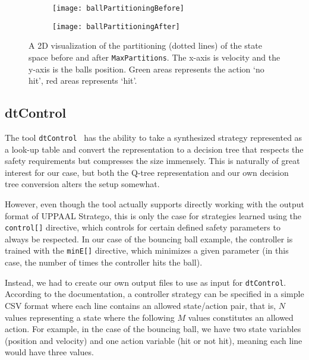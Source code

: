 \begin{figure}[ht]
    \begin{subfigure}[b]{.4\textwidth}
        \centering
        \texttt{[image: ballPartitioningBefore]}
        \label{fig:ballPartitioningBefore}
    \end{subfigure}
    \begin{subfigure}[b]{.4\textwidth}
        \centering
        \texttt{[image: ballPartitioningAfter]}
        \label{fig:ballPartitioningAfter}
    \end{subfigure}
    \caption{%
        A 2D visualization of the partitioning (dotted lines) of the state space
        before and after \texttt{MaxPartitions}. The x-axis is velocity and the
        y-axis is the balls position. Green areas represents the action `no
        hit', red areas represents `hit'.
    }\label{fig:ballPartitioning}
\end{figure}

\subsection{dtControl}%
\label{subsec:dtControl}

The tool \texttt{dtControl}~\cite{dtControl2} has the ability to take a
synthesized strategy represented as a look-up table and convert the
representation to a decision tree that respects the safety requirements but
compresses the size immensely.  This is naturally of great interest for our
case, but both the Q-tree representation and our own decision tree conversion
alters the setup somewhat.

However, even though the tool actually supports directly working with the output
format of UPPAAL Stratego, this is only the case for strategies learned using
the \texttt{control[]} directive, which controls for certain defined safety
parameters to always be respected. In our case of the bouncing ball example, the
controller is trained with the \texttt{minE[]} directive, which minimizes a
given parameter (in this case, the number of times the controller hits the
ball).

Instead, we had to create our own output files to use as input for
\texttt{dtControl}. According to the documentation, a controller strategy can be
specified in a simple CSV format where each line contains an allowed
state/action pair, that is, $N$ values representing a state where the following
$M$ values constitutes an allowed action. For example, in the case of the
bouncing ball, we have two state variables (position and velocity) and one action
variable (hit or not hit), meaning each line would have three values.

